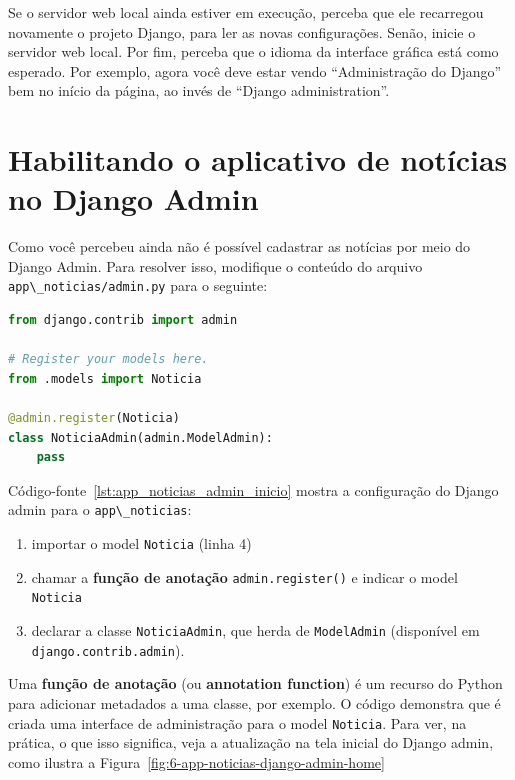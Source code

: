 \documentclass[brazil,a4paper,oneside,openright,parskip=full]{book}
\newcommand{\passthrough}[1]{#1}
\providecommand{\tightlist}{%
  \setlength{\itemsep}{0pt}\setlength{\parskip}{0pt}}
\begin{document}
Se o servidor web local ainda estiver em execução, perceba que ele
recarregou novamente o projeto Django, para ler as novas configurações.
Senão, inicie o servidor web local. Por fim, perceba que o idioma da
interface gráfica está como esperado. Por exemplo, agora você deve estar
vendo ``Administração do Django'' bem no início da página, ao invés de
``Django administration''.

\hypertarget{habilitando-o-aplicativo-de-notuxedcias-no-django-admin}{%
\section{Habilitando o aplicativo de notícias no Django
Admin}\label{habilitando-o-aplicativo-de-notuxedcias-no-django-admin}}

Como você percebeu ainda não é possível cadastrar as notícias por meio
do Django Admin. Para resolver isso, modifique o conteúdo do arquivo
\passthrough{\lstinline!app\_noticias/admin.py!} para o seguinte:

\begin{lstlisting}[language=Python, caption={Código inicial para configuração do Django admin}, label=lst:app_noticias_admin_inicio]
from django.contrib import admin

# Register your models here.
from .models import Noticia

@admin.register(Noticia)
class NoticiaAdmin(admin.ModelAdmin):
    pass
\end{lstlisting}

Código-fonte~\ref{lst:app_noticias_admin_inicio} mostra a configuração
do Django admin para o \passthrough{\lstinline!app\_noticias!}:

\begin{enumerate}
\def\labelenumi{\arabic{enumi}.}
\tightlist
\item
  importar o model \passthrough{\lstinline!Noticia!} (linha 4)
\item
  chamar a \textbf{função de anotação}
  \passthrough{\lstinline!admin.register()!} e indicar o model
  \passthrough{\lstinline!Noticia!}
\item
  declarar a classe \passthrough{\lstinline!NoticiaAdmin!}, que herda de
  \passthrough{\lstinline!ModelAdmin!} (disponível em
  \passthrough{\lstinline!django.contrib.admin!}).
\end{enumerate}

Uma \textbf{função de anotação} (ou \textbf{annotation function}) é um
recurso do Python para adicionar metadados a uma classe, por exemplo. O
código demonstra que é criada uma interface de administração para o
model \passthrough{\lstinline!Noticia!}. Para ver, na prática, o que
isso significa, veja a atualização na tela inicial do Django admin, como
ilustra a Figura~\ref{fig:6-app-noticias-django-admin-home}
\end{document}
